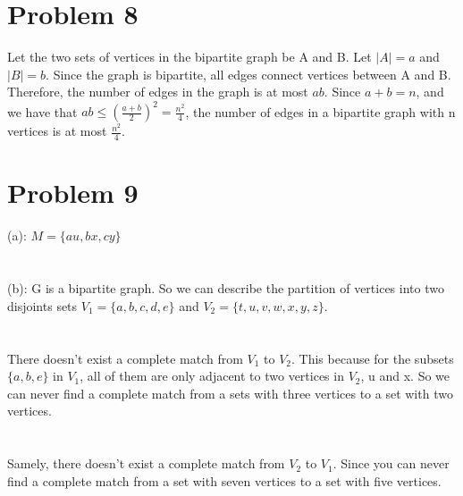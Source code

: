\documentclass{article}
\begin{document}
\section{Problem 8}
Let the two sets of vertices in the bipartite graph be A and B. Let $|A| = a$ and $|B| = b$. Since the graph is bipartite, all edges connect vertices between A and B. Therefore, the number of edges in the graph is at most $ab$. Since $a + b = n$, and we have that $ab \leq (\frac{a+b}{2})^2 = \frac{n^2}{4}$, the number of edges in a bipartite graph with n vertices is at most $\frac{n^2}{4}$.
\section{Problem 9}
(a): $M = \{ au, bx, cy \}$\\
\\ \hspace*{\fill} \\
(b): G is a bipartite graph. So we can describe the partition of vertices into two disjoints sets $V_1 = \{ a, b, c, d, e \}$ and $V_2 = \{ t, u, v, w, x, y, z \}$.\\
\\ \hspace*{\fill} \\
There doesn't exist a complete match from $V_1$ to $V_2$. This because for the subsets $\{ a, b, e\}$ in $V_1$, all of them are only adjacent to two vertices in $V_2$, u and x. So we can never find a complete match from a sets with three vertices to a set with two vertices.\\
\\ \hspace*{\fill} \\
Samely, there doesn't exist a complete match from $V_2$ to $V_1$. Since you can never find a complete match from a set with seven vertices to a set with five vertices.\\
\end{document}

